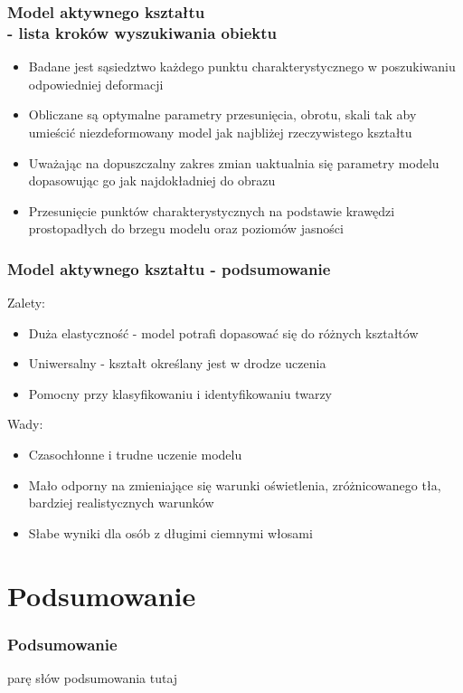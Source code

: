 \documentclass[xcolor=table]{beamer}
\begin{document}
\begin{frame}
  \frametitle{Model aktywnego kształtu \\ - lista kroków wyszukiwania obiektu}
  \begin{itemize}
\item Badane jest sąsiedztwo każdego punktu charakterystycznego w poszukiwaniu odpowiedniej deformacji
\item Obliczane są optymalne parametry przesunięcia, obrotu, skali tak aby umieścić niezdeformowany model jak najbliżej rzeczywistego kształtu
\item Uważając na dopuszczalny zakres zmian uaktualnia się parametry modelu dopasowując go jak najdokładniej do obrazu
\item Przesunięcie punktów charakterystycznych na podstawie krawędzi prostopadłych do brzegu modelu oraz poziomów jasności
\end{itemize}
\end{frame}

\begin{frame}
  \frametitle{Model aktywnego kształtu - podsumowanie}
    { Zalety:
\begin{itemize}
\item Duża elastyczność - model potrafi dopasować się do różnych kształtów
\item Uniwersalny - kształt określany jest w drodze uczenia
\item Pomocny przy klasyfikowaniu i identyfikowaniu twarzy
\end{itemize}
}
   {\noindent 
Wady:
\begin{itemize}
\item  Czasochłonne i trudne uczenie modelu 
\item  Mało odporny na zmieniające się warunki oświetlenia, zróżnicowanego tła, bardziej realistycznych warunków
\item  Słabe wyniki dla osób z długimi ciemnymi włosami
\end{itemize}}
\end{frame}

\section{Podsumowanie}

\begin{frame}[fragile]
  \frametitle{Podsumowanie}

  parę słów podsumowania tutaj
  
\end{frame}
\end{document}
